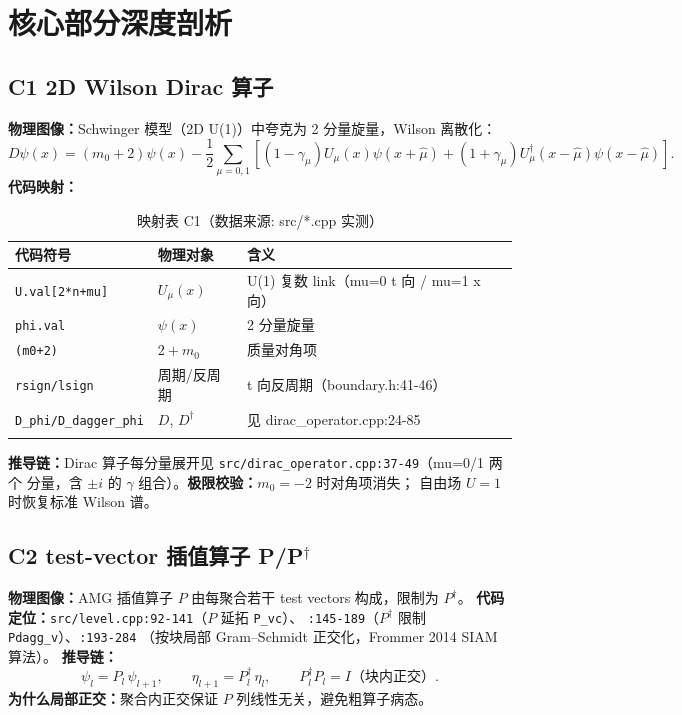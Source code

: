 \documentclass[UTF8]{ctexart}
\begin{document}
\section{核心部分深度剖析}

\subsection{C1 2D Wilson Dirac 算子}
\textbf{物理图像：}Schwinger 模型（2D U(1)）中夸克为 2 分量旋量，Wilson 离散化：
\begin{equation}\label{eq:wilson2d}
D\psi(x) = (m_0+2)\psi(x) - \frac12\sum_{\mu=0,1}\left[(1-\gamma_\mu)U_\mu(x)\psi(x+\hat\mu) + (1+\gamma_\mu)U_\mu^\dagger(x-\hat\mu)\psi(x-\hat\mu)\right].
\end{equation}
\textbf{代码映射：}
\begin{xltabular}{\textwidth}{lXX}
\toprule
\textcolor{map}{代码符号} & 物理对象 & 含义 \\
\midrule
\endhead
\texttt{U.val[2*n+mu]} & $U_\mu(x)$ & U(1) 复数 link（mu=0 t 向 / mu=1 x 向）\\
\texttt{phi.val} & $\psi(x)$ & 2 分量旋量 \\
\texttt{(m0+2)} & $2+m_0$ & 质量对角项 \\
\texttt{rsign/lsign} & 周期/反周期 & t 向反周期（boundary.h:41-46）\\
\texttt{D\_phi/D\_dagger\_phi} & $D$, $D^\dagger$ & 见 dirac\_operator.cpp:24-85 \\
\bottomrule
\caption{映射表 C1（数据来源: src/*.cpp 实测）}
\end{xltabular}
\textbf{推导链：}Dirac 算子每分量展开见 \texttt{src/dirac\_operator.cpp:37-49}（mu=0/1 两个
分量，含 $\pm i$ 的 $\gamma$ 组合）。\textbf{极限校验：}$m_0=-2$ 时对角项消失；
自由场 $U=1$ 时恢复标准 Wilson 谱。

\subsection{C2 test-vector 插值算子 P/P$^\dagger$}
\textbf{物理图像：}AMG 插值算子 $P$ 由每聚合若干 test vectors 构成，限制为 $P^\dagger$。
\textbf{代码定位：}\texttt{src/level.cpp:92-141}（$P$ 延拓 \texttt{P\_vc}）、
\texttt{:145-189}（$P^\dagger$ 限制 \texttt{Pdagg\_v}）、\texttt{:193-284}
（按块局部 Gram--Schmidt 正交化，Frommer 2014 SIAM 算法）。
\textbf{推导链：}
\begin{equation}\label{eq:p}
\psi_{l} = P_l\,\psi_{l+1},\qquad \eta_{l+1} = P_l^\dagger\,\eta_{l},\qquad P_l^\dagger P_l = I \text{（块内正交）}.
\end{equation}
\textbf{为什么局部正交：}聚合内正交保证 $P$ 列线性无关，避免粗算子病态。
\end{document}
